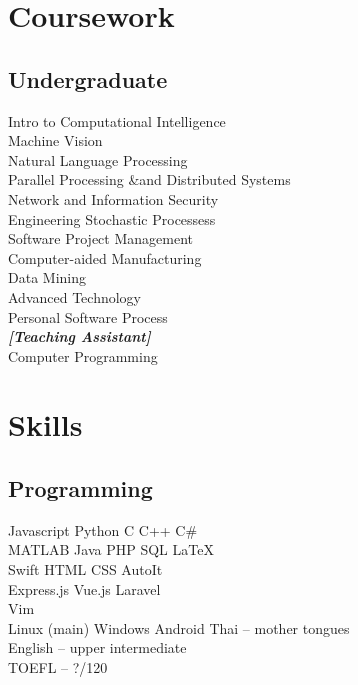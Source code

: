 \documentclass[]{deedy-resume-openfont}
\begin{document}
\begin{minipage}[t]{0.33\textwidth}

\section{Coursework}
\subsection{Undergraduate}
Intro to Computational Intelligence \\
Machine Vision \\
Natural Language Processing \\
Parallel Processing \&and Distributed Systems \\
Network and Information Security \\
Engineering Stochastic Processess \\
Software Project Management \\
Computer-aided Manufacturing \\
Data Mining \\
Advanced Technology \\
Personal Software Process \\
{\footnotesize \textit{\textbf{[Teaching Assistant]}}} \\
Computer Programming \\


\section{Skills}
\subsection{Programming}
Javascript \textbullet{} Python \textbullet{} C \textbullet{} C++ \textbullet{} C\# \\
MATLAB \textbullet{} Java \textbullet{} PHP \textbullet{} SQL \textbullet{} \LaTeX\ \\
Swift \textbullet{} HTML \textbullet{} CSS \textbullet{} AutoIt \\ 
Express.js \textbullet{} Vue.js \textbullet{} Laravel \\
Vim \\
Linux (main) \textbullet{} Windows \textbullet{} Android
Thai – mother tongues \\
English – upper intermediate \\
TOEFL – ?/120
\sectionsep

%
%

\end{minipage} 
\end{document}

